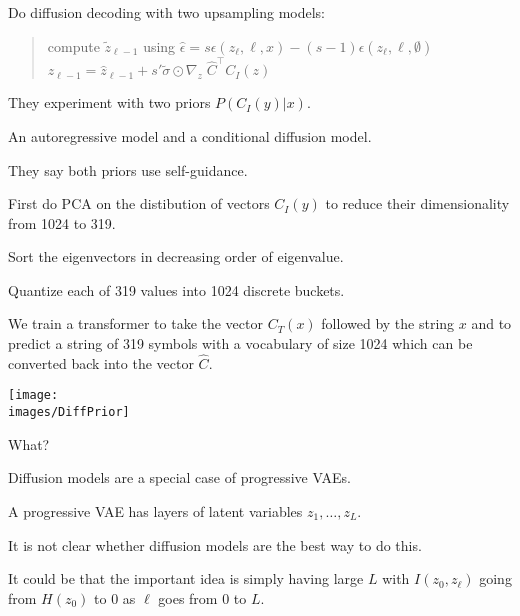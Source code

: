 {\vfill
Do diffusion decoding with two upsampling models:

\vfill
\begin{quotation}
compute $\tilde{z}_{\ell-1}$ using $\hat{\epsilon} = s\epsilon(z_\ell,\ell,x) - (s-1)\epsilon(z_\ell,\ell,\emptyset)$
\vfill
$z_{\ell-1} = \hat{z}_{\ell-1} + s'\tilde{\sigma}\odot\nabla_z\;\hat{C}^\top C_I(z)$
\end{quotation}


They experiment with two priors $P(C_I(y)|x)$.

\vfill
An autoregressive model and a conditional diffusion model.

\vfill
They say both priors use self-guidance.


First do PCA on the distibution of vectors $C_I(y)$ to reduce their dimensionality from 1024 to 319.

\vfill
Sort the eigenvectors in decreasing order of eigenvalue.

\vfill
Quantize each of 319 values into 1024 discrete buckets.

\vfill
We train a transformer to take the vector $C_T(x)$ followed by the string $x$
and to predict a string of 319 symbols with a vocabulary of size 1024 which can be converted back into the vector $\hat{C}$.


\centerline{\texttt{[image: \\images/DiffPrior]}}

\vfill
\vfill
What?


Diffusion models are a special case of progressive VAEs.

\vfill
A progressive VAE has layers of latent variables $z_1,\dots,z_{L}$.

\vfill
It is not clear whether diffusion models are the best way to do this.

\vfill
It could be that the important idea is simply having large $L$ with
$I(z_0,z_\ell)$ going from $H(z_0)$ to 0 as $\ell$ goes from $0$ to $L$.


}


